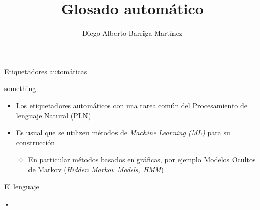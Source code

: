 \documentclass[12pt]{beamer}
\author{Diego Alberto Barriga Martínez}
\title{Glosado automático}
\begin{document}
\begin{frame}
\titlepage
\end{frame}

\begin{frame}
\tableofcontents
\end{frame}


\begin{frame}{Etiquetadores automáticas}
\protect\hypertarget{etiquetadores-automuxe1ticas}{}

something

\begin{itemize}

\item
  Los etiquetadores automáticos con una tarea común del Procesamiento de
  lenguaje Natural (PLN)
\item
  Es usual que se utilizen métodos de \emph{Machine Learning (ML)} para
  su construcción

  \begin{itemize}

  \item
    En particular métodos basados en gráficas, por ejemplo Modelos
    Ocultos de Markov (\emph{Hidden Markov Models, HMM})
  \end{itemize}
\end{itemize}

\end{frame}

\begin{frame}{El lenguaje}
\protect\hypertarget{el-lenguaje}{}

\end{frame}

\begin{frame}{•}

\end{frame}
\end{document}
